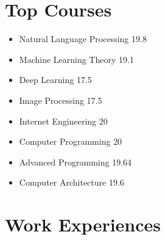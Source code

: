 \documentclass[11pt,a4paper,roman]{moderncv} %
\begin{document}
\section{Top Courses}

\begin{multicols}{2} 
	\begin{itemize}
		\item Natural Language Processing \hfill{19.8}
		\item Machine Learning Theory \hfill{19.1}
		\item Deep Learning \hfill{17.5}
		\item Image Processing \hfill{17.5}
		\item Internet Engineering						\hfill{20}
		\item Computer Programming               		\hfill{20}  
		\item Advanced Programming                    \hfill{19.64}
		\item Computer Architecture                    \hfill{19.6}
	\end{itemize}
\end{multicols}

\section{Work Experiences}
\end{document}
